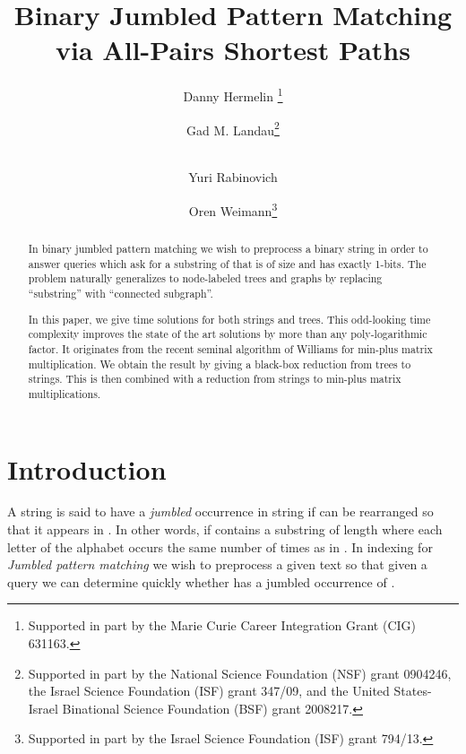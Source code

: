 \documentclass[11pt]{llncs}
\begin{document}
\title{Binary Jumbled Pattern Matching\\ via All-Pairs Shortest Paths}


\author{Danny Hermelin \thanks{Supported in part by the Marie Curie Career Integration Grant (CIG) 631163.}  \and Gad M. Landau\thanks{Supported in part by the National Science Foundation (NSF) grant 0904246, the Israel Science Foundation (ISF) grant 347/09,
and the United States-Israel Binational Science Foundation (BSF) grant 2008217.}  \and \\ Yuri Rabinovich
\and Oren Weimann\thanks{Supported in part by the Israel Science Foundation (ISF) grant 794/13.}}

\maketitle

\begin{abstract}
In binary jumbled pattern matching we wish to preprocess a binary string  in order to answer queries  which ask for a substring of  that is of size  and  has exactly  1-bits. The problem naturally generalizes to node-labeled trees and graphs by replacing ``substring'' with ``connected subgraph''.

\hspace{15pt} In this paper, we give   time solutions for both strings and trees. This odd-looking time complexity improves the state of the art  solutions by more than any poly-logarithmic factor. It originates from the recent seminal algorithm of Williams for min-plus matrix multiplication.
We obtain the result by giving a black-box reduction from trees to strings. This is then combined with a  reduction from strings to min-plus matrix multiplications.
\end{abstract}


\section{Introduction}
\label{sec:introduction}

A string  is said to have a {\em jumbled} occurrence in string  if  can be rearranged so that it appears in . In other words, if  contains a substring of length  where each letter of the alphabet occurs the same number of times as in .
In indexing for {\em Jumbled pattern matching} we wish to preprocess a given text  so that given a query  we can determine quickly whether  has a jumbled occurrence of .
\end{document}
